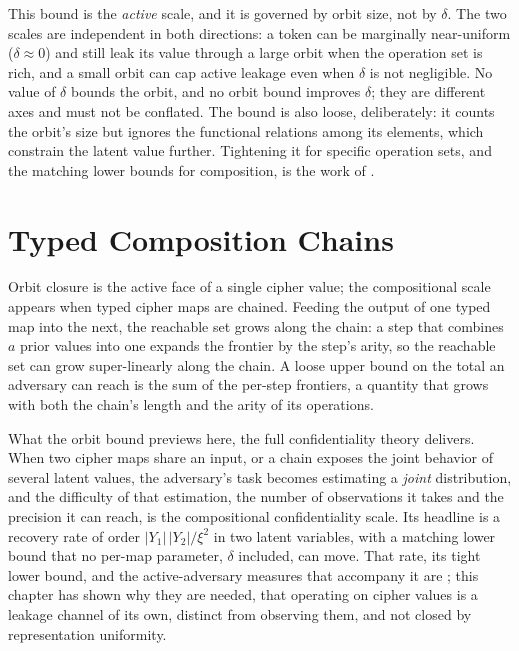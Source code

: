 \begin{remark}
\label{rem:active-vs-marginal}
This bound is the \emph{active} scale, and it is governed by orbit size, not
by $\delta$. The two scales are independent in both directions: a token can
be marginally near-uniform ($\delta \approx 0$) and still leak its value
through a large orbit when the operation set is rich, and a small orbit can
cap active leakage even when $\delta$ is not negligible. No value of $\delta$
bounds the orbit, and no orbit bound improves $\delta$; they are different
axes and must not be conflated. The bound is also loose, deliberately: it
counts the orbit's size but ignores the functional relations among its
elements, which constrain the latent value further. Tightening it for
specific operation sets, and the matching lower bounds for composition, is
the work of .
\end{remark}

\section{Typed Composition Chains}
\label{sec:typed-chains}

Orbit closure is the active face of a single cipher value; the compositional
scale appears when typed cipher maps are chained. Feeding the output of one
typed map into the next, the reachable set grows along the chain: a step
that combines $a$ prior values into one expands the frontier by the step's
arity, so the reachable set can grow super-linearly along the chain. A loose
upper bound on the total an adversary can reach is the sum of the per-step
frontiers, a quantity that grows with both the chain's length and the arity
of its operations.

What the orbit bound previews here, the full confidentiality theory
delivers. When two cipher maps share an input, or a chain exposes the joint
behavior of several latent values, the adversary's task becomes estimating a
\emph{joint} distribution, and the difficulty of that estimation, the number
of observations it takes and the precision it can reach, is the compositional
confidentiality scale. Its headline is a recovery rate of order
$\lvert Y_1\rvert\,\lvert Y_2\rvert / \xi^2$ in two latent variables, with a
matching lower bound that no per-map parameter, $\delta$ included, can move.
That rate, its tight lower bound, and the active-adversary measures that
accompany it are ; this chapter has shown why
they are needed, that operating on cipher values is a leakage channel of its
own, distinct from observing them, and not closed by representation
uniformity.


